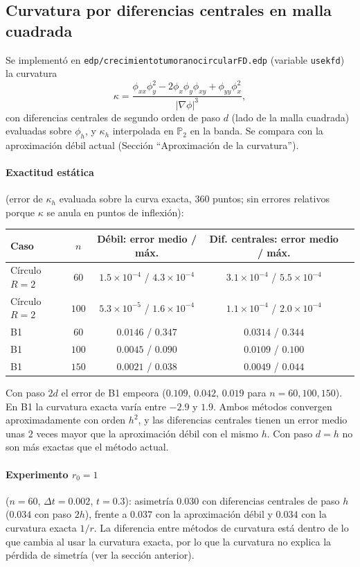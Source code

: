 \subsection{Curvatura por diferencias centrales en malla cuadrada}

Se implementó en \texttt{edp/crecimientotumoranocircularFD.edp} (variable \texttt{usekfd}) la curvatura
\[
\kappa=\frac{\phi_{xx}\phi_y^2-2\phi_x\phi_y\phi_{xy}+\phi_{yy}\phi_x^2}{|\nabla\phi|^3},
\]
con diferencias centrales de segundo orden de paso $d$ (lado de la malla cuadrada) evaluadas sobre $\phi_h$, y $\kappa_h$ interpolada en $\mathbb{P}_2$ en la banda. Se compara con la aproximación débil actual (Sección ``Aproximación de la curvatura'').

\paragraph{Exactitud estática} (error de $\kappa_h$ evaluada sobre la curva exacta, 360 puntos; sin errores relativos porque $\kappa$ se anula en puntos de inflexión):
\begin{center}
\begin{tabular}{lcccc}
\toprule
Caso & $n$ & Débil: error medio / máx. & Dif. centrales: error medio / máx.\\
\midrule
Círculo $R=2$ & $60$ & $1.5\times10^{-4}$ / $4.3\times10^{-4}$ & $3.1\times10^{-4}$ / $5.5\times10^{-4}$\\
Círculo $R=2$ & $100$ & $5.3\times10^{-5}$ / $1.6\times10^{-4}$ & $1.1\times10^{-4}$ / $2.0\times10^{-4}$\\
B1 & $60$ & $0.0146$ / $0.347$ & $0.0314$ / $0.344$\\
B1 & $100$ & $0.0045$ / $0.090$ & $0.0109$ / $0.100$\\
B1 & $150$ & $0.0021$ / $0.038$ & $0.0049$ / $0.044$\\
\bottomrule
\end{tabular}
\end{center}
Con paso $2d$ el error de B1 empeora ($0.109$, $0.042$, $0.019$ para $n=60,100,150$). En B1 la curvatura exacta varía entre $-2.9$ y $1.9$. Ambos métodos convergen aproximadamente con orden $h^2$, y las diferencias centrales tienen un error medio unas $2$ veces mayor que la aproximación débil con el mismo $h$. Con paso $d=h$ no son más exactas que el método actual.

\paragraph{Experimento $r_0=1$} ($n=60$, $\Delta t=0.002$, $t=0.3$): asimetría $0.030$ con diferencias centrales de paso $h$ ($0.034$ con paso $2h$), frente a $0.037$ con la aproximación débil y $0.034$ con la curvatura exacta $1/r$. La diferencia entre métodos de curvatura está dentro de lo que cambia al usar la curvatura exacta, por lo que la curvatura no explica la pérdida de simetría (ver la sección anterior).


